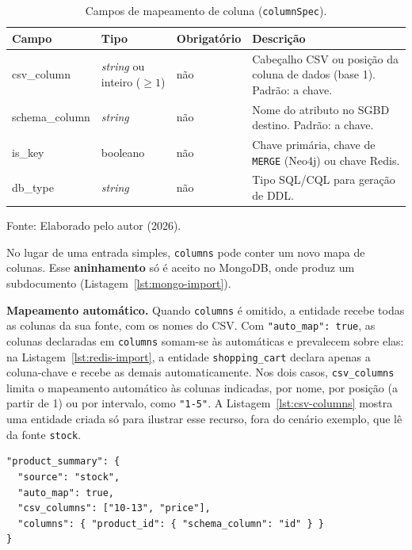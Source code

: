 \begin{table}[H]
  \caption{Campos de mapeamento de coluna (\texttt{columnSpec}).}
  \label{tab:columnspec}
  \centering
  \begin{tabular}{>{\ttfamily}l l l >{\raggedright\arraybackslash}p{5cm}}
    \toprule
    \normalfont\textbf{Campo} & \textbf{Tipo} & \textbf{Obrigatório} & \textbf{Descrição} \\
    \midrule
    csv\_column    & \textit{string} ou inteiro ($\geq 1$) & não & Cabeçalho CSV ou posição da coluna de dados (base 1). Padrão: a chave. \\
    schema\_column & \textit{string} & não & Nome do atributo no SGBD destino. Padrão: a chave. \\
    is\_key        & booleano & não & Chave primária, chave de \texttt{MERGE} (Neo4j) ou chave Redis. \\
    db\_type       & \textit{string} & não & Tipo SQL/CQL para geração de DDL. \\
    \bottomrule
  \end{tabular}
  \par\vspace{4pt}
  {\footnotesize Fonte: Elaborado pelo autor (2026).}
\end{table}

No lugar de uma entrada simples, \texttt{columns} pode conter um novo mapa de colunas.
Esse \textbf{aninhamento} só é aceito no MongoDB, onde produz um subdocumento
(Listagem~\ref{lst:mongo-import}).

\textbf{Mapeamento automático.} Quando \texttt{columns} é omitido, a entidade recebe todas
as colunas da sua fonte, com os nomes do CSV. Com \texttt{"auto\_map": true}, as colunas
declaradas em \texttt{columns} somam-se às automáticas e prevalecem sobre elas: na
Listagem~\ref{lst:redis-import}, a entidade \texttt{shopping\_cart} declara apenas a
coluna-chave e recebe as demais automaticamente. Nos dois casos, \texttt{csv\_columns}
limita o mapeamento automático às colunas indicadas, por nome, por posição (a partir de 1)
ou por intervalo, como \texttt{"1-5"}. A Listagem~\ref{lst:csv-columns} mostra uma
entidade criada só para ilustrar esse recurso, fora do cenário exemplo, que lê da fonte
\texttt{stock}.

\begin{lstlisting}[style=jsonstyle,caption={Entidade ilustrativa com \texttt{auto\_map} e \texttt{csv\_columns}.},label={lst:csv-columns}]
"product_summary": {
  "source": "stock",
  "auto_map": true,
  "csv_columns": ["10-13", "price"],
  "columns": { "product_id": { "schema_column": "id" } }
}
\end{lstlisting}

